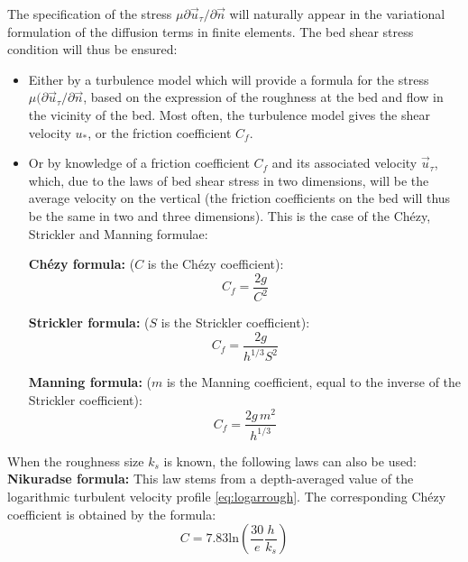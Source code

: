 The specification of the stress $\mu\partial\vec{u}_\tau / \partial \vec{n}$ will naturally appear in
the variational formulation of the diffusion terms in finite elements.
The bed shear stress condition will thus be ensured:
\begin{itemize}
\item Either by a turbulence model which will provide a formula for the stress
  $\mu (\partial\vec{u}_\tau / \partial \vec{n}$, based on the expression of
  the roughness at the bed and flow in the vicinity of the bed. Most
  often, the turbulence model gives the shear velocity $u_{\ast}$, or the
  friction coefficient $C_{f}$.

\item Or by knowledge of a friction coefficient $C_{f}$ and its associated
  velocity $\vec{u}_\tau$, which, due to the laws of bed shear stress
  in two dimensions, will be the average velocity on the vertical (the friction
  coefficients on the bed will thus be the same in two and three dimensions).
  This is the case of the Ch\'{e}zy, Strickler and Manning formulae:

  \textbf{Ch\'{e}zy formula:}%
  ($C$ is the Ch\'{e}zy coefficient):%
  \begin{equation}
    C_{f}=\dfrac{2g}{C^{2}}%
  \end{equation}

  \textbf{Strickler formula:}%
  ($S$ is the Strickler coefficient):%
  \begin{equation}
    C_{f}=\dfrac{2g}{h^{1/3}S^{2}}%
  \end{equation}

  \textbf{Manning formula:}%
  ($m$ is the Manning coefficient, equal to the inverse of the Strickler coefficient):%
  \begin{equation}
    C_{f}=\dfrac{2g\,m^{2}}{h^{1/3}}%
  \end{equation}
\end{itemize}
When the roughness size $k_{s}$ is known, the following laws can also be used:\\

\textbf{Nikuradse formula:}%
This law stems from a depth-averaged value of the logarithmic turbulent velocity profile \eqref{eq:logarrough}.
The corresponding Chézy coefficient is obtained by the formula:%
\begin{equation}
  C=7.83\text{ln}\left(\frac{30}{e}\dfrac{h}{k_s}\right)
\end{equation}

